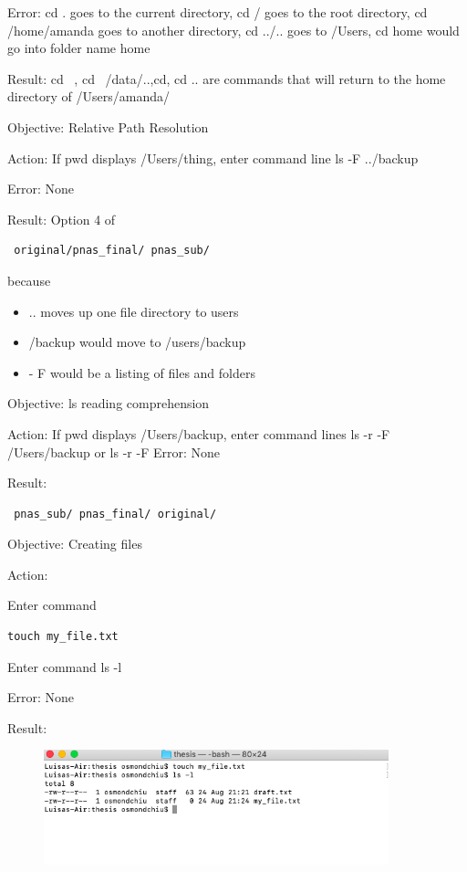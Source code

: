 \documentclass{article}
\begin{document}
\par
Error: cd . goes to the current directory, cd / goes to the root directory, cd /home/amanda goes to another directory, cd ../.. goes to /Users, cd home would go into folder name home\par
Result: cd ~, cd ~/data/..,cd, cd .. are commands that will return to the home directory of /Users/amanda/\par
Objective: Relative Path Resolution\par
Action: If pwd displays /Users/thing, enter command line ls -F ../backup\par
Error: None\par
Result: Option 4 of \begin{verbatim} original/pnas_final/ pnas_sub/\end{verbatim} because 
\begin{itemize}
\item .. moves up one file directory to users
\item /backup would move to /users/backup
\item - F would be a listing of files and folders
\end{itemize}
Objective: ls reading comprehension\par
Action: If pwd displays /Users/backup, enter command lines ls -r -F /Users/backup or ls -r -F 
Error: None\par
Result: \begin{verbatim} pnas_sub/ pnas_final/ original/\end{verbatim}\par

Objective: Creating files\par
Action:\par
Enter command \begin{verbatim}touch my_file.txt\end{verbatim}\par
Enter command ls -l\par
Error: None\par
Result: \par
\begin{figure}[htp]
    \centering
    \includegraphics[width=10cm]{Screenshot3.png}
    \label{fig:ls-3}
\end{figure}
\end{document}
